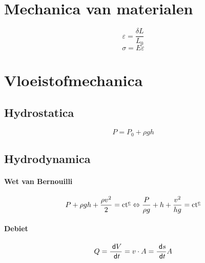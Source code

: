 \section{Mechanica van materialen}

\[
  \varepsilon = \frac{\delta L}{L_0}
\]
\[
  \sigma = E \varepsilon
\]



\section{Vloeistofmechanica}

\subsection{Hydrostatica}

\[
  P = P_0 + \rho g h
\]

\subsection{Hydrodynamica}

\paragraph{Wet van Bernouilli}
\[
  P + \rho g h + \frac{\rho v^2}{2} = \mathrm{ct{^{\underline{\mathrm{e}}}}}
  \Leftrightarrow
  \frac{P}{\rho g} + h + \frac{v^2}{hg} = \mathrm{ct{^{\underline{\mathrm{e}}}}}
\]
\paragraph{Debiet}
\[
  Q = \frac{\;\textsf{d}V}{\;\textsf{d}t} = v \cdot A = \frac{\;\textsf{d}s}{\;\textsf{d}t} A
\]
